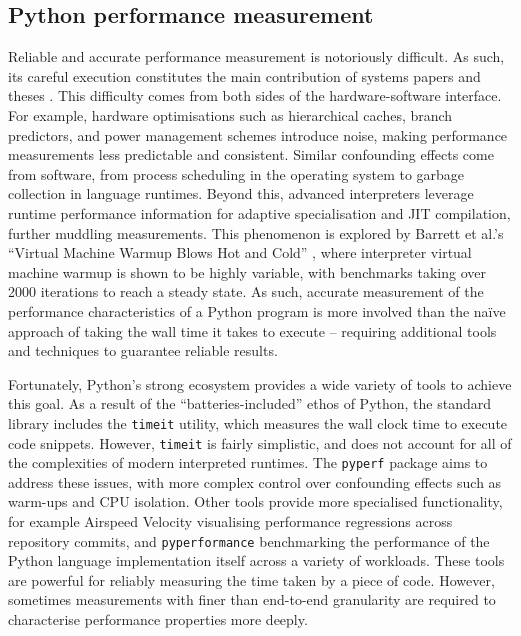 \subsection{Python performance measurement}
\label{ssec:python-perf-measurement}

Reliable and accurate performance measurement is notoriously difficult.
As such, its careful execution constitutes the main contribution of systems papers and theses \cite{crapeperformance} \cite{harris2021understanding}.
This difficulty comes from both sides of the hardware-software interface.
For example, hardware optimisations such as hierarchical caches, branch predictors, and power management schemes introduce noise, making performance measurements less predictable and consistent. Similar confounding effects come from software, from process scheduling in the operating system to garbage collection in language runtimes.
Beyond this, advanced interpreters leverage runtime performance information for adaptive specialisation and JIT compilation, further muddling measurements. This phenomenon is explored by Barrett et al.'s ``Virtual Machine Warmup Blows Hot and Cold'' \cite{barrettVirtualMachineWarmup2017}, where interpreter virtual machine warmup is shown to be highly variable, with benchmarks taking over 2000 iterations to reach a steady state.
As such, accurate measurement of the performance characteristics of a Python program is more involved than the na\"ive approach of taking the wall time it takes to execute -- requiring additional tools and techniques to guarantee reliable results.

Fortunately, Python's strong ecosystem provides a wide variety of tools to achieve this goal.
As a result of the ``batteries-included'' ethos of Python, the standard library includes the \texttt{timeit} utility, which measures the wall clock time to execute code snippets. However, \texttt{timeit} is fairly simplistic, and does not account for all of the complexities of modern interpreted runtimes. The \texttt{pyperf} \cite{victorstinnerPsfPyperf2025} package aims to address these issues, with more complex control over confounding effects such as warm-ups and CPU isolation.
Other tools provide more specialised functionality, for example Airspeed Velocity \cite{michaeldroettboomAirspeedvelocityAsv2025} visualising performance regressions across repository commits, and \texttt{pyperformance} \cite{collinwinterPythonPyperformance2025} benchmarking the performance of the Python language implementation itself across a variety of workloads.
These tools are powerful for reliably measuring the time taken by a piece of code. However, sometimes measurements with finer than end-to-end granularity are required to characterise performance properties more deeply.

